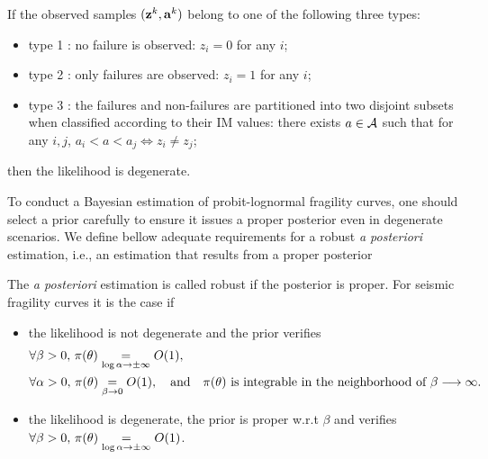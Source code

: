 \begin{defi}\label{def:doe:degeneracy}
    If the observed samples $(\mathbf{z}^k,\mathbf{a}^k)$ belong to one of the following three types:
    \begin{itemize}
        \item
        type 1 : no failure is observed: $z_i=0$ for any $i$;
        \item type 2 : only failures are observed: $z_i=1$ for any $i$;
        \item type 3 : the failures and non-failures are partitioned into two disjoint subsets when classified according to their IM values:
        there exists $a\in\mathcal{A}$ such that for any $i,j$, $a_i<a<a_j\Longleftrightarrow z_i\ne z_j$; %
    \end{itemize}
    then the likelihood is degenerate.
\end{defi}




To conduct a Bayesian estimation of probit-lognormal fragility curves, one should select a prior carefully to ensure it issues a proper posterior even in degenerate scenarios. We define bellow adequate requirements for a robust \emph{a posteriori} estimation, i.e., an estimation that results from a proper posterior

\begin{defi}\label{def:doe:robust-estimation}
    The \emph{a posteriori} estimation is called robust if the posterior is proper. For  seismic fragility curves it is the case if 
    \begin{itemize}
        \item the likelihood is not degenerate and the prior verifies
            \begin{align*}
                &\forall\beta>0,\,\pi(\theta)\overset{}{\underset{\log\alpha\rightarrow\pm\infty}{=}}O(1),\\
                & \forall\alpha>0,\,\pi(\theta)\overset{}{\underset{\beta\rightarrow0}{=}} O(1),\quad\text{and}\quad \pi(\theta)\ \text{is integrable in the neighborhood of $\beta\longrightarrow\infty$.}
            \end{align*}
        \item the likelihood is degenerate, the prior is proper w.r.t $\beta$ and verifies $\forall\beta>0,\, \pi(\theta)\overset{}{\underset{\log\alpha\rightarrow\pm\infty}{=}}O(1)$.
    \end{itemize}
\end{defi}


